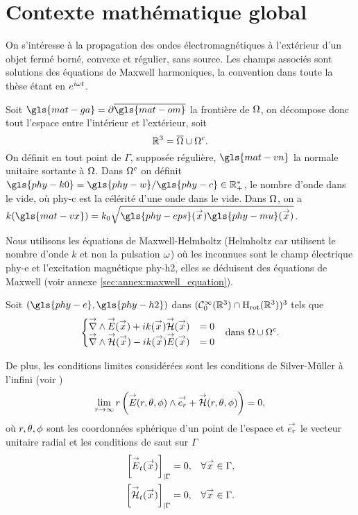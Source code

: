 \chapter{Contexte mathématique global}

\label{sec:context_math}
\minitoc
\newpage

On s’intéresse à la propagation des ondes électromagnétiques à l'extérieur d'un objet fermé borné, convexe et régulier, sans source. 
Les champs associés sont solutions des équations de Maxwell harmoniques, la convention dans toute la thèse étant en \(e^{i\omega t}\). 

Soit \(\gls{mat-ga}=\partial\overline{\gls{mat-om}}\) la frontière de \(\Omega\), on décompose donc tout l'espace entre l'intérieur et l'extérieur, soit 
\[
\mathbb R^3 = \overline{\Omega}\cup{\Omega}^c.
\]
On définit en tout point de \(\Gamma\), supposée régulière, \(\gls{mat-vn}\) la normale unitaire sortante à \(\Omega\).
Dans \(\Omega^c\) on définit \(\gls{phy-k0}=\gls{phy-w} / \gls{phy-c} \in \RR_+^*\), le nombre d'onde dans le vide, où \gls{phy-c} 
est la célérité d'une onde dans le vide.
Dans \(\Omega\), on a \(k(\gls{mat-vx})=k_0\sqrt{\gls{phy-eps}(\vx)\gls{phy-mu}(\vx)}\).


Nous utilisons les équations de Maxwell-Helmholtz (Helmholtz car utilisent le nombre d'onde \(k\) et non la pulsation \(\omega\)) où les inconnues sont le champ électrique \gls{phy-e} et l'excitation magnétique \gls{phy-h2}, elles se déduisent des équations de Maxwell  (voir annexe \ref{sec:annex:maxwell_equation}). 

Soit \((\gls{phy-e},\gls{phy-h2})\) dans \((\mathcal{C}_0^\infty(\mathbb R^3)\cap\mathrm{H}_\mathrm{rot}(\mathbb R^3))^3\) tels que
\begin{align}
  \left\lbrace
  \begin{matrix}
    {\overset{\rightarrow}{\nabla}}\wedge {\overset{\rightarrow}{E}}({\overset{\rightarrow}{x}}) + i k({\overset{\rightarrow}{x}}) {\overset{\rightarrow}{\mathcal{H}}}({\overset{\rightarrow}{x}}) &= 0
    \\
    {\overset{\rightarrow}{\nabla}}\wedge {\overset{\rightarrow}{\mathcal{H}}}({\overset{\rightarrow}{x}}) - i k({\overset{\rightarrow}{x}}) {\overset{\rightarrow}{E}}({\overset{\rightarrow}{x}}) &= 0
  \end{matrix}
  \right. && \text{dans \(\Omega\cup\Omega^c\).}
  \label{eq:unicite:maxwell_ext}
\end{align}

De plus, les conditions limites considérées sont les conditions de Silver-Müller à l'infini (voir \cite[eq (5.2.25), p.~182]{nedelec_acoustic_2001})
\begin{equation}
  \label{eq:probleme_initial:CL:silver_muller}
  \lim_{r\rightarrow\infty} r\left({\overset{\rightarrow}{E}}(r,\theta,\phi) \wedge {\overset{\rightarrow}{e_r}} + {\overset{\rightarrow}{\mathcal{H}}}(r,\theta,\phi) \right) = 0,
\end{equation}
où \(r,\theta,\phi\) sont les coordonnées sphérique d'un point de l'espace et \({\overset{\rightarrow}{e_r}}\) le vecteur unitaire radial et les conditions de saut sur \(\Gamma\)
\begin{equation}
  \label{eq:probleme_initial:CL:saut_sur_Gamma}
  \begin{aligned}
    \left[{\overset{\rightarrow}{E}}_t({\overset{\rightarrow}{x}})\right]_{|\Gamma} & = 0, & \forall {\overset{\rightarrow}{x}} \in \Gamma,
    \\
    \left[{\overset{\rightarrow}{\mathcal{H}}}_t({\overset{\rightarrow}{x}})\right]_{|\Gamma} & = 0, & \forall {\overset{\rightarrow}{x}} \in \Gamma.
  \end{aligned}
\end{equation}

